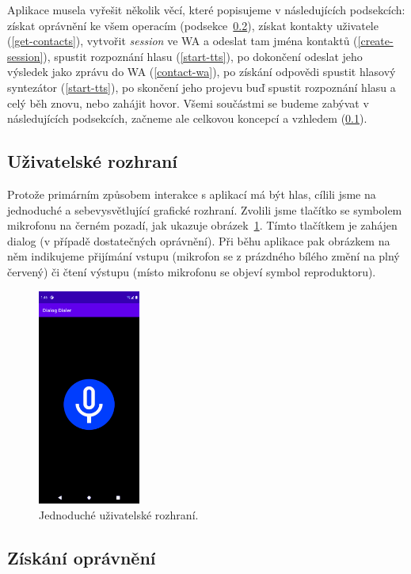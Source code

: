 Aplikace musela vyřešit několik věcí, které popisujeme
v následujících podsekcích: získat oprávnění ke všem operacím (podsekce~\ref{get-permissions}),
získat kontakty uživatele (\ref{get-contacts}), vytvořit \textit{session} ve WA a odeslat
tam jména kontaktů (\ref{create-session}), spustit rozpoznání hlasu (\ref{start-tts}), po dokončení odeslat jeho výsledek
jako zprávu do WA (\ref{contact-wa}), po získání odpovědi spustit hlasový syntezátor (\ref{start-tts}), po skončení
jeho projevu buď spustit rozpoznání hlasu a celý běh znovu, nebo zahájit
hovor. Všemi součástmi se budeme zabývat v následujících podsekcích, začneme
ale celkovou koncepcí a vzhledem (\ref{desc-ui}).

\subsection{Uživatelské rozhraní}\label{desc-ui}

Protože primárním způsobem interakce
s aplikací má být hlas, cílili jsme na jednoduché a sebevysvětlující grafické
rozhraní. Zvolili jsme tlačítko se symbolem mikrofonu na černém pozadí,
jak ukazuje obrázek~\ref{img-ui}. Tímto tlačítkem je zahájen dialog (v případě
dostatečných oprávnění). Při běhu aplikace
pak obrázkem na něm indikujeme přijímání vstupu (mikrofon se z prázdného bílého
změní na plný červený) či čtení výstupu (místo mikrofonu se objeví symbol reproduktoru).

\begin{figure}[h]
    \centering
    \includegraphics[width=0.3\textwidth]{../img/ui.pdf}
    \caption{Jednoduché uživatelské rozhraní.}
    \label{img-ui}
\end{figure}

\subsection{Získání oprávnění}\label{get-permissions}

